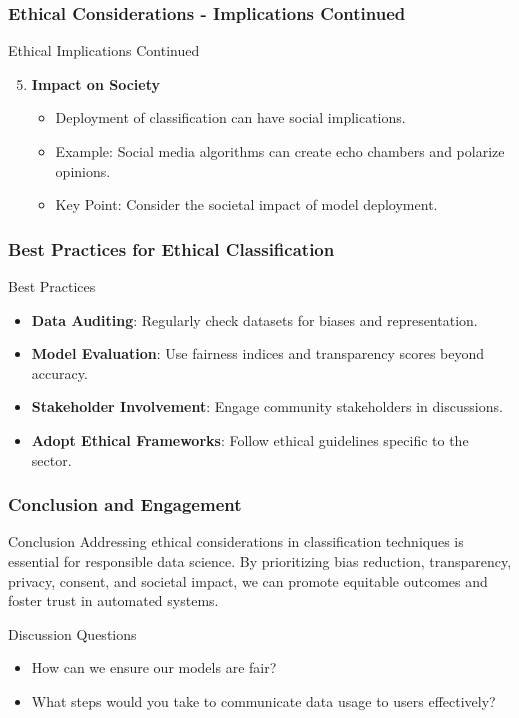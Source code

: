 \documentclass[aspectratio=169]{beamer}
\begin{document}
\begin{frame}[fragile]
    \frametitle{Ethical Considerations - Implications Continued}
    \begin{block}{Ethical Implications Continued}
        \begin{enumerate}
            \setcounter{enumi}{4}
            \item \textbf{Impact on Society}
                \begin{itemize}
                    \item Deployment of classification can have social implications.
                    \item Example: Social media algorithms can create echo chambers and polarize opinions.
                    \item Key Point: Consider the societal impact of model deployment.
                \end{itemize}
        \end{enumerate}
    \end{block}
\end{frame}

\begin{frame}[fragile]
    \frametitle{Best Practices for Ethical Classification}
    \begin{block}{Best Practices}
        \begin{itemize}
            \item \textbf{Data Auditing}: Regularly check datasets for biases and representation.
            \item \textbf{Model Evaluation}: Use fairness indices and transparency scores beyond accuracy.
            \item \textbf{Stakeholder Involvement}: Engage community stakeholders in discussions.
            \item \textbf{Adopt Ethical Frameworks}: Follow ethical guidelines specific to the sector.
        \end{itemize}
    \end{block}
\end{frame}

\begin{frame}[fragile]
    \frametitle{Conclusion and Engagement}
    \begin{block}{Conclusion}
        Addressing ethical considerations in classification techniques is essential for responsible data science. By prioritizing bias reduction, transparency, privacy, consent, and societal impact, we can promote equitable outcomes and foster trust in automated systems.
    \end{block}
  
    \begin{block}{Discussion Questions}
        \begin{itemize}
            \item How can we ensure our models are fair?
            \item What steps would you take to communicate data usage to users effectively?
        \end{itemize}
    \end{block}
\end{frame}
\end{document}
